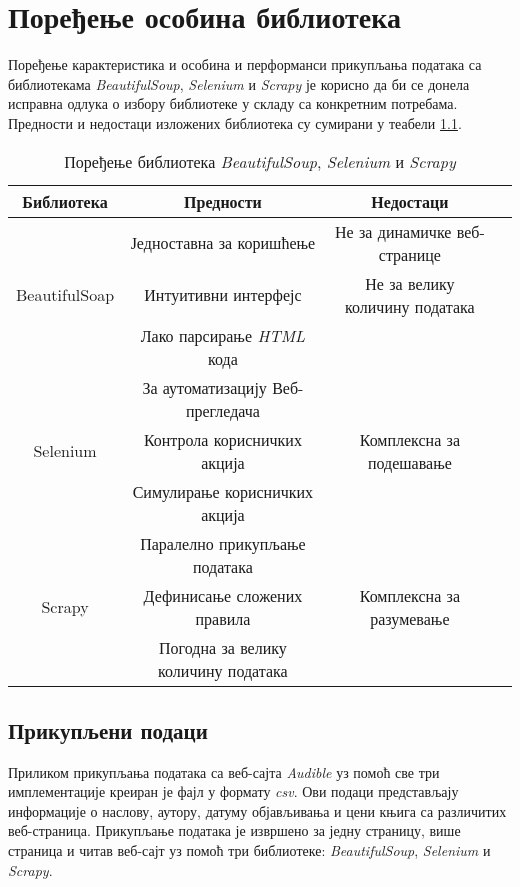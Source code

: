 \documentclass[12pt,oneside]{memoir}
\begin{document}
\chapter{Поређење особина библиотека}
\label{chp:poredjenje}

Поређење карактеристика и особина и перформанси прикупљања података са библиотекама \textit{BeautifulSoup}, \textit{Selenium} и \textit{Scrapy} је корисно да би се донела исправна одлука о избору библиотеке у складу са конкретним потребама. Предности и недостаци изложених библиотека су сумирани у теабели \ref{tab:poredjenje}.

\begin{table}[htbp]
\centering
\caption{Поређење библиотека \textit{BeautifulSoup}, \textit{Selenium} и \textit{Scrapy}}
\label{tab:poredjenje}
\begin{tabular}{ |c|c|c|c| } 
\hline
\textbf{Библиотека} & \textbf{Предности} & \textbf{Недостаци} \\

\hline
\multirow{3}{6em}{BeautifulSoap} & Једноставна за коришћење & Не за динамичке веб-странице \\ 
& Интуитивни интерфејс & Не за велику количину података \\ 
& Лако парсирање \textit{HTML} кода &  \\ 

\hline
\multirow{3}{6em}{Selenium} & За аутоматизацију Веб-прегледача & \\ 
& Контрола корисничких акција &  Комплексна за подешавање \\ 
& Симулирање корисничких акција &  \\ 

\hline
\multirow{3}{6em}{Scrapy} & Паралелно прикупљање података & \\ 
& Дефинисање сложених правила & Комплексна за разумевање \\ 
& Погодна за велику количину података &  \\ 
\hline
\end{tabular}
\end{table}

\section{Прикупљени подаци}
Приликом прикупљања података са веб-сајта \textit{Audible} уз помоћ све три имплементације креиран је фајл у формату \textit{csv}. Ови подаци представљају информације о наслову, аутору, датуму објављивања и цени књига са различитих веб-страница. Прикупљање података је извршено за једну страницу, више страница и читав веб-сајт уз помоћ три библиотеке: \textit{BeautifulSoup}, \textit{Selenium} и \textit{Scrapy}.
\end{document}
